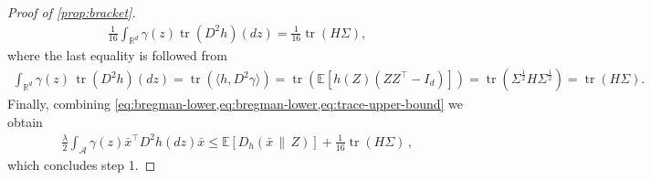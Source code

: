 \documentclass[11pt]{article}
\newcommand{\R}{\mathbb R}
\newcommand{\E}{\mathbb E}
\newcommand{\tr}{\operatorname{tr}}
\newcommand{\1}{\mathbf 1}
\begin{document}
\begin{proof}[Proof of \cref{prop:bracket}]
\begin{align}
        \frac1{16}
        \int_{\R^d}\gamma(z)\tr(D^2h)(dz)
        =
        \frac1{16}\tr(H\Sigma),
        \label{eq:trace-upper-bound}
    \end{align}
    where the last equality is followed from
    \begin{align}
        \int_{\R^d}\gamma(z)\,\tr(D^2h)(dz)
        =
        \tr(\langle h, D^2\gamma\rangle)
        =
        \tr\left(\E\left[h(Z)(ZZ^\top-I_d)\right]\right)
        =
        \tr(\Sigma^{\frac12}H\Sigma^{\frac12})
        =
        \tr(H\Sigma).
        \label{eq:standardized-trace-curvature}
    \end{align}
    Finally, combining \cref{eq:bregman-lower,eq:bregman-lower,eq:trace-upper-bound} we obtain
    \begin{align}
        \frac\lambda2
        \int_{\mathcal A}
        \gamma(z)\bar{x}^\top D^2h(dz)\bar{x}
        \leq
        \E[D_h(\bar{x}\,\|\,Z)]
        +
        \frac1{16}\tr(H\Sigma)\,,
        \label{eq:bracket-step1}
    \end{align}
    which concludes step 1.


\end{proof}
\end{document}

